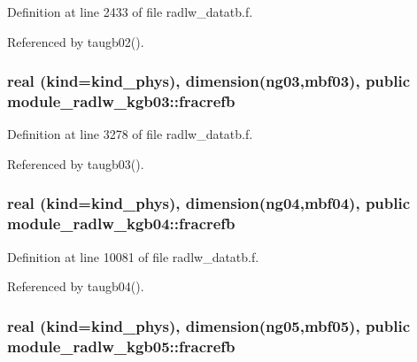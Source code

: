 Definition at line 2433 of file radlw\+\_\+datatb.\+f.



Referenced by taugb02().

\subsubsection[{\texorpdfstring{fracrefb}{fracrefb}}]{\setlength{\rightskip}{0pt plus 5cm}real (kind=kind\+\_\+phys), dimension(ng03,mbf03), public module\+\_\+radlw\+\_\+kgb03\+::fracrefb}\hypertarget{group__module__radlw__main_gaf1d33a7362e73bf40ef592bc9863b612}{}\label{group__module__radlw__main_gaf1d33a7362e73bf40ef592bc9863b612}


Definition at line 3278 of file radlw\+\_\+datatb.\+f.



Referenced by taugb03().

\subsubsection[{\texorpdfstring{fracrefb}{fracrefb}}]{\setlength{\rightskip}{0pt plus 5cm}real (kind=kind\+\_\+phys), dimension(ng04,mbf04), public module\+\_\+radlw\+\_\+kgb04\+::fracrefb}\hypertarget{group__module__radlw__main_gae8d5d56d09dfbe06d918c6b098e3fddf}{}\label{group__module__radlw__main_gae8d5d56d09dfbe06d918c6b098e3fddf}


Definition at line 10081 of file radlw\+\_\+datatb.\+f.



Referenced by taugb04().

\subsubsection[{\texorpdfstring{fracrefb}{fracrefb}}]{\setlength{\rightskip}{0pt plus 5cm}real (kind=kind\+\_\+phys), dimension(ng05,mbf05), public module\+\_\+radlw\+\_\+kgb05\+::fracrefb}\hypertarget{group__module__radlw__main_gaf7b1fd9c6b966e03a226dd8cbc058670}{}\label{group__module__radlw__main_gaf7b1fd9c6b966e03a226dd8cbc058670}


